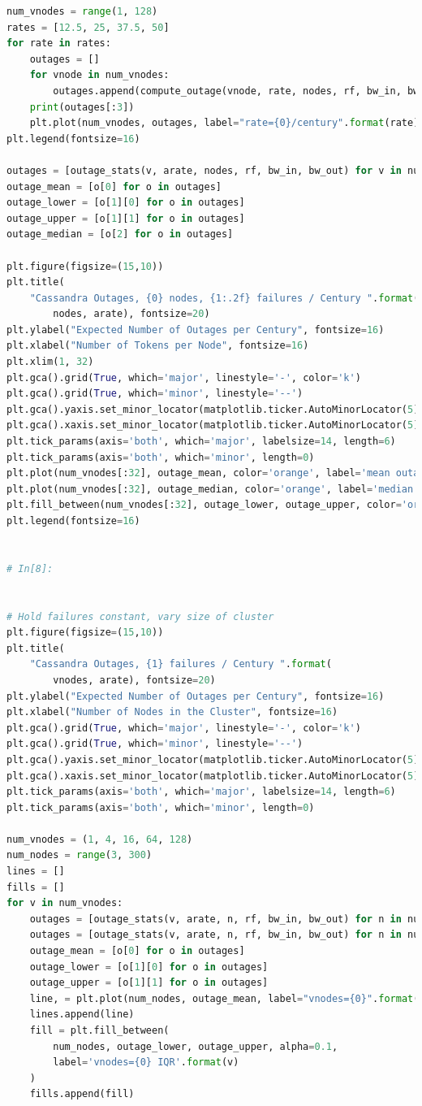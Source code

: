 \documentclass{article}
\begin{document}
\begin{lstlisting}[language=Python]
num_vnodes = range(1, 128)
rates = [12.5, 25, 37.5, 50]
for rate in rates:
    outages = []
    for vnode in num_vnodes:
        outages.append(compute_outage(vnode, rate, nodes, rf, bw_in, bw_out))
    print(outages[:3])
    plt.plot(num_vnodes, outages, label="rate={0}/century".format(rate))
plt.legend(fontsize=16)

outages = [outage_stats(v, arate, nodes, rf, bw_in, bw_out) for v in num_vnodes[:32]]
outage_mean = [o[0] for o in outages]
outage_lower = [o[1][0] for o in outages]
outage_upper = [o[1][1] for o in outages]
outage_median = [o[2] for o in outages]

plt.figure(figsize=(15,10))
plt.title(
    "Cassandra Outages, {0} nodes, {1:.2f} failures / Century ".format(
        nodes, arate), fontsize=20)
plt.ylabel("Expected Number of Outages per Century", fontsize=16)
plt.xlabel("Number of Tokens per Node", fontsize=16)
plt.xlim(1, 32)
plt.gca().grid(True, which='major', linestyle='-', color='k')
plt.gca().grid(True, which='minor', linestyle='--')
plt.gca().yaxis.set_minor_locator(matplotlib.ticker.AutoMinorLocator(5))
plt.gca().xaxis.set_minor_locator(matplotlib.ticker.AutoMinorLocator(5))
plt.tick_params(axis='both', which='major', labelsize=14, length=6)
plt.tick_params(axis='both', which='minor', length=0)
plt.plot(num_vnodes[:32], outage_mean, color='orange', label='mean outages')
plt.plot(num_vnodes[:32], outage_median, color='orange', label='median outages', linestyle='--')
plt.fill_between(num_vnodes[:32], outage_lower, outage_upper, color='orange', alpha=0.05, label='IQR')
plt.legend(fontsize=16)


# In[8]:


# Hold failures constant, vary size of cluster
plt.figure(figsize=(15,10))
plt.title(
    "Cassandra Outages, {1} failures / Century ".format(
        vnodes, arate), fontsize=20)
plt.ylabel("Expected Number of Outages per Century", fontsize=16)
plt.xlabel("Number of Nodes in the Cluster", fontsize=16)
plt.gca().grid(True, which='major', linestyle='-', color='k')
plt.gca().grid(True, which='minor', linestyle='--')
plt.gca().yaxis.set_minor_locator(matplotlib.ticker.AutoMinorLocator(5))
plt.gca().xaxis.set_minor_locator(matplotlib.ticker.AutoMinorLocator(5))
plt.tick_params(axis='both', which='major', labelsize=14, length=6)
plt.tick_params(axis='both', which='minor', length=0)

num_vnodes = (1, 4, 16, 64, 128)
num_nodes = range(3, 300)
lines = []
fills = []
for v in num_vnodes:
    outages = [outage_stats(v, arate, n, rf, bw_in, bw_out) for n in num_nodes]
    outages = [outage_stats(v, arate, n, rf, bw_in, bw_out) for n in num_nodes]
    outage_mean = [o[0] for o in outages]
    outage_lower = [o[1][0] for o in outages]
    outage_upper = [o[1][1] for o in outages]
    line, = plt.plot(num_nodes, outage_mean, label="vnodes={0}".format(v))
    lines.append(line)
    fill = plt.fill_between(
        num_nodes, outage_lower, outage_upper, alpha=0.1,
        label='vnodes={0} IQR'.format(v)
    )
    fills.append(fill)



\end{lstlisting}
\end{document}
